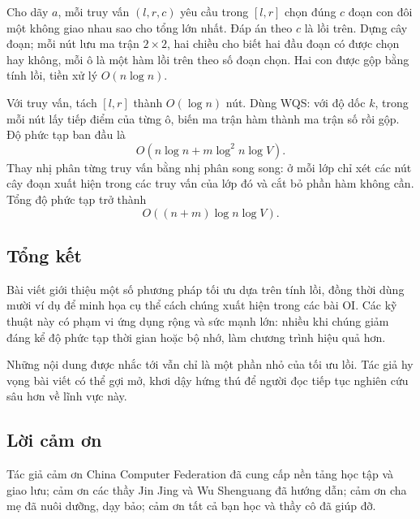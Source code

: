 \documentclass[11pt]{article}
\begin{document}
Cho dãy \(a\), mỗi truy vấn \((l,r,c)\) yêu cầu trong \([l,r]\) chọn đúng
\(c\) đoạn con đôi một không giao nhau sao cho tổng lớn nhất. Đáp án theo
\(c\) là lồi trên. Dựng cây đoạn; mỗi nút lưu ma trận \(2\times2\), hai chiều
cho biết hai đầu đoạn có được chọn hay không, mỗi ô là một hàm lồi trên theo
số đoạn chọn. Hai con được gộp bằng tính lồi, tiền xử lý \(O(n\log n)\).

Với truy vấn, tách \([l,r]\) thành \(O(\log n)\) nút. Dùng WQS: với độ dốc
\(k\), trong mỗi nút lấy tiếp điểm của từng ô, biến ma trận hàm thành ma trận
số rồi gộp. Độ phức tạp ban đầu là
\[
  O(n\log n+m\log^2 n\log V).
\]
Thay nhị phân từng truy vấn bằng nhị phân song song: ở mỗi lớp chỉ xét các nút
cây đoạn xuất hiện trong các truy vấn của lớp đó và cắt bỏ phần hàm không cần.
Tổng độ phức tạp trở thành
\[
  O((n+m)\log n\log V).
\]

\subsection{Tổng kết}

Bài viết giới thiệu một số phương pháp tối ưu dựa trên tính lồi, đồng thời
dùng mười ví dụ để minh họa cụ thể cách chúng xuất hiện trong các bài OI. Các
kỹ thuật này có phạm vi ứng dụng rộng và sức mạnh lớn: nhiều khi chúng giảm
đáng kể độ phức tạp thời gian hoặc bộ nhớ, làm chương trình hiệu quả hơn.

Những nội dung được nhắc tới vẫn chỉ là một phần nhỏ của tối ưu lồi. Tác giả
hy vọng bài viết có thể gợi mở, khơi dậy hứng thú để người đọc tiếp tục nghiên
cứu sâu hơn về lĩnh vực này.

\subsection{Lời cảm ơn}

Tác giả cảm ơn China Computer Federation đã cung cấp nền tảng học tập và giao
lưu; cảm ơn các thầy Jin Jing và Wu Shenguang đã hướng dẫn; cảm ơn cha mẹ đã
nuôi dưỡng, dạy bảo; cảm ơn tất cả bạn học và thầy cô đã giúp đỡ.
\end{document}
